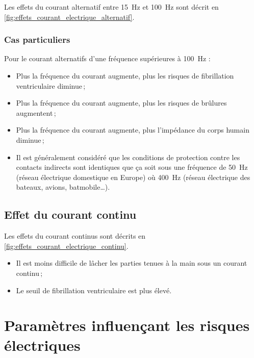 Les effets du courant alternatif entre \SI{15}{\hertz} et \SI{100}{\hertz} sont décrit en \autoref{fig:effets_courant_electrique_alternatif}. 



\subsubsection{Cas particuliers}

Pour le courant alternatifs d'une fréquence supérieures à \SI{100}{\hertz} :

\begin{itemize}
\item Plus la fréquence du courant augmente, plus les risques de fibrillation ventriculaire diminue\,;
\item Plus la fréquence du courant augmente, plus les risques de brûlures augmentent\,;
\item Plus la fréquence du courant augmente, plus l'impédance du corps humain diminue\,;
\item Il est généralement considéré que les conditions de protection contre les contacts indirects sont identiques que ça soit sous une fréquence de \SI{50}{\hertz} (réseau électrique domestique en Europe) où \SI{400}{\hertz} (réseau électrique des bateaux, avions, batmobile\ldots).
\end{itemize}

\subsection{Effet du courant continu}

Les effets du courant continus sont décrits en \autoref{fig:effets_courant_electrique_continu}.



\begin{itemize}
\item Il est moins difficile de lâcher les parties tenues à la main sous un courant continu\,;
\item Le seuil de fibrillation ventriculaire est plus élevé.
\end{itemize}

\section{Paramètres influençant les risques électriques}

